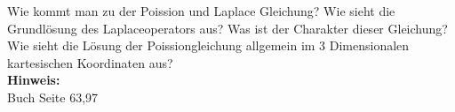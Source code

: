 \begin{question}[section=3,subsection=31,name={Poission und Laplace},difficulty=7,type=mdl,mode=exm,tags={}]
	Wie kommt man zu der Poission und Laplace Gleichung? Wie sieht die Grundlösung des Laplaceoperators aus? Was ist der Charakter dieser Gleichung? Wie sieht die Lösung der Poissiongleichung allgemein im 3 Dimensionalen kartesischen Koordinaten aus?
	\\ \textbf{Hinweis:}\\
	Buch Seite 63,97
\end{question}
\begin{solution}
	
\end{solution}